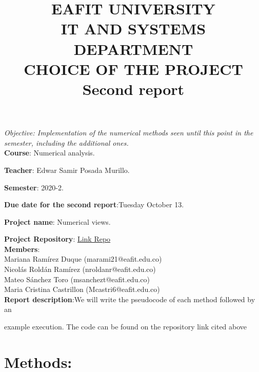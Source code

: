 \documentclass[letterpaper,12pt]{article}
\begin{document}
\title{EAFIT UNIVERSITY\\

IT AND SYSTEMS DEPARTMENT \\

CHOICE OF THE PROJECT \\


Second report
\date{}
}

\maketitle


\textit{Objective: Implementation of the numerical methods seen until this point in the semester, including the additional ones.}\\

\textbf{Course}: Numerical analysis.

\textbf{Teacher}: Edwar Samir Posada Murillo.

\textbf{Semester}: 2020-2.

\textbf{Due date for the second report}:Tuesday October 13.

\textbf{Project name}: Numerical views.

\textbf{Project Repository}: \href{https://github.com/Sanchezt99/NumericalViews}{Link Repo} \\

\textbf{Members}:\\

Mariana Ramírez Duque (marami21@eafit.edu.co) \\

Nicolás Roldán Ramírez (nroldanr@eafit.edu.co) \\

Mateo Sánchez Toro (msanchezt@eafit.edu.co)\\

Maria Cristina Castrillon (Mcastri6@eafit.edu.co) \\


\textbf{Report description}:We will write the pseudocode of each method followed by an


example execution. The code can be found on the repository link cited above

\BlankLine
\BlankLine
\section{Methods:}

\BlankLine
\BlankLine
\end{document}
